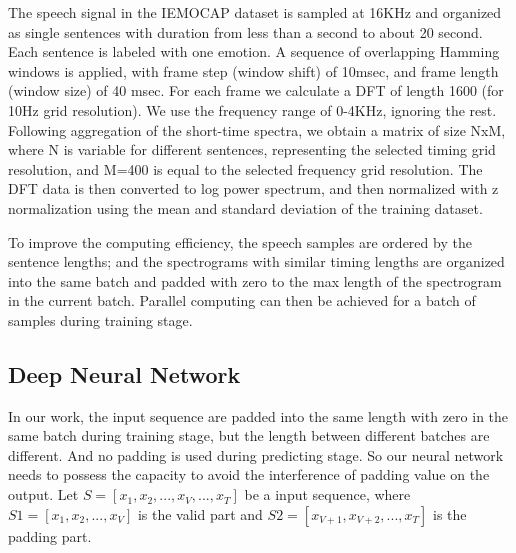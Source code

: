 \documentclass[a4paper]{article}
\begin{document}
The speech signal in the IEMOCAP dataset is sampled at 16KHz and organized as single sentences with duration from less than a second to about 20 second. Each sentence is labeled with one emotion. A sequence of overlapping Hamming windows is applied, with frame step (window shift) of 10msec, and frame length (window size) of 40 msec. For each frame we calculate a DFT of length 1600 (for 10Hz grid resolution). We use the frequency range of 0-4KHz, ignoring the rest. Following aggregation of the short-time spectra, we obtain a matrix of size NxM, where N is variable for different sentences, representing the selected timing grid resolution,  and M=400 is equal to the selected frequency grid resolution. The DFT data is then converted to log power spectrum, and then normalized with z normalization using the mean and standard deviation of the training dataset.

To improve the computing efficiency, the speech samples are ordered by the sentence lengths; and the spectrograms with similar timing lengths are organized into the same batch and padded with zero to the max length of the spectrogram in the current batch.  Parallel computing can then be achieved for a batch of samples during training stage.

\subsection{Deep Neural Network}
\label{ssec:deep_neural_network}

In our work, the input sequence are padded into the same length with zero in the same batch during training stage, but the length between different batches are different. And no padding is used during predicting stage. So our neural network needs to possess the capacity to avoid the interference of padding value on the output.  Let $S=[x_1, x_2, ..., x_V, ..., x_T]$ be a input sequence, where $S1=[x_1, x_2, ..., x_V]$ is the valid part and $S2=[x_{V+1}, x_{V+2}, ..., x_T]$ is the padding part.
\end{document}
